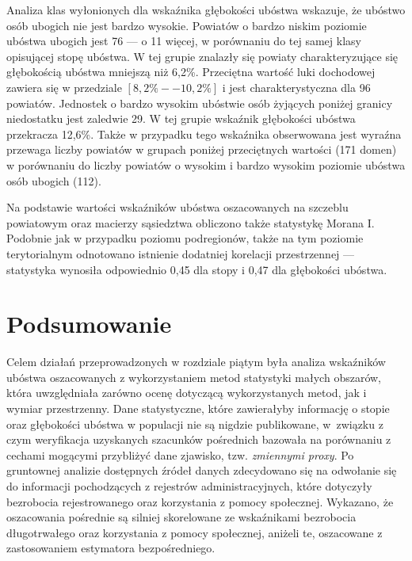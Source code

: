 Analiza klas wyłonionych dla wskaźnika głębokości ubóstwa wskazuje, że ubóstwo osób ubogich nie jest bardzo wysokie. Powiatów o bardzo niskim poziomie ubóstwa ubogich jest 76 --- o 11 więcej, w porównaniu do tej samej klasy opisującej stopę ubóstwa. W tej grupie znalazły się powiaty charakteryzujące się głębokością ubóstwa mniejszą niż 6,2\%. Przeciętna wartość luki dochodowej zawiera się w przedziale $[8,2\% -- 10,2\%]$ i jest charakterystyczna dla 96 powiatów. Jednostek o bardzo wysokim ubóstwie osób żyjących poniżej granicy niedostatku jest zaledwie 29. W tej grupie wskaźnik głębokości ubóstwa przekracza 12,6\%. Także w przypadku tego wskaźnika obserwowana jest wyraźna przewaga liczby powiatów w grupach poniżej przeciętnych wartości (171 domen) w porównaniu do liczby powiatów o wysokim i bardzo wysokim poziomie ubóstwa osób ubogich (112).

Na podstawie wartości wskaźników ubóstwa oszacowanych na szczeblu powiatowym oraz macierzy sąsiedztwa obliczono także statystykę Morana I. Podobnie jak w przypadku poziomu podregionów, także na tym poziomie terytorialnym odnotowano istnienie dodatniej korelacji przestrzennej --- statystyka wynosiła odpowiednio 0,45 dla stopy i 0,47 dla głębokości ubóstwa. 

\section{Podsumowanie}

Celem działań przeprowadzonych w rozdziale piątym była analiza wskaźników ubóstwa oszacowanych z wykorzystaniem metod statystyki małych obszarów, która uwzględniała zarówno ocenę dotyczącą wykorzystanych metod, jak i wymiar przestrzenny. Dane statystyczne, które zawierałyby informację o stopie oraz głębokości ubóstwa w populacji nie są nigdzie publikowane, w~związku z czym weryfikacja uzyskanych szacunków pośrednich bazowała na porównaniu z cechami mogącymi przybliżyć dane zjawisko, tzw. \textit{zmiennymi proxy}. Po gruntownej analizie dostępnych źródeł danych zdecydowano się na odwołanie się do informacji pochodzących z rejestrów administracyjnych, które dotyczyły bezrobocia rejestrowanego oraz korzystania z pomocy społecznej. Wykazano, że oszacowania pośrednie są silniej skorelowane ze wskaźnikami bezrobocia długotrwałego oraz korzystania z pomocy społecznej, aniżeli te, oszacowane z zastosowaniem estymatora bezpośredniego. 


